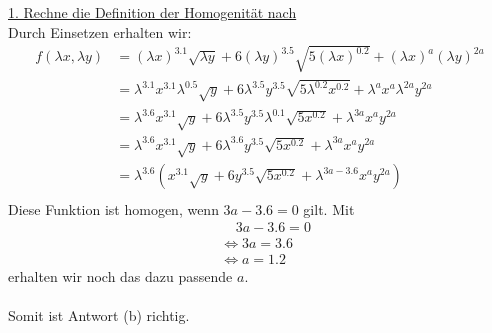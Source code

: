 \underline{1. Rechne die Definition der Homogenität nach}\\
Durch Einsetzen erhalten wir:
\begin{align*}
f(\lambda x , \lambda y) 
&= (\lambda x )^{3.1} \sqrt{\lambda y}
	+ 6 (\lambda y)^{3.5} \sqrt{5 (\lambda x)^{0.2}}
	+(\lambda x)^a (\lambda y)^{2a}\\
&= \lambda^{3.1} x^{3.1}  \lambda^{0.5} \sqrt{ y}
	+ 6 \lambda^{3.5} y^{3.5} \sqrt{5 \lambda^{0.2} x^{0.2}}
	+\lambda^a x^a \lambda^{2a} y^{2a}\\
&= \lambda^{3.6} x^{3.1}  \sqrt{ y}
	+ 6 \lambda^{3.5} y^{3.5} \lambda^{0.1} \sqrt{5  x^{0.2}}
	+\lambda^{3a} x^a  y^{2a}\\
&= \lambda^{3.6} x^{3.1}  \sqrt{ y}
	+ 6 \lambda^{3.6} y^{3.5}  \sqrt{5  x^{0.2}}
	+\lambda^{3a} x^a  y^{2a}\\
&= \lambda^{3.6} \left( x^{3.1}  \sqrt{ y}
	+ 6 y^{3.5}  \sqrt{5  x^{0.2}}
	+\lambda^{3a - 3.6} x^a  y^{2a} \right)\\		
\end{align*}
Diese Funktion ist homogen, wenn $3a - 3.6 = 0$ gilt.
Mit 
\begin{align*}
&\ \ \ \ \ 3 a - 3.6 = 0\\
&\Leftrightarrow
3a = 3.6\\
&\Leftrightarrow
a = 1.2
\end{align*}
erhalten wir noch das dazu passende $a$.\\
\\
Somit ist Antwort (b) richtig.


